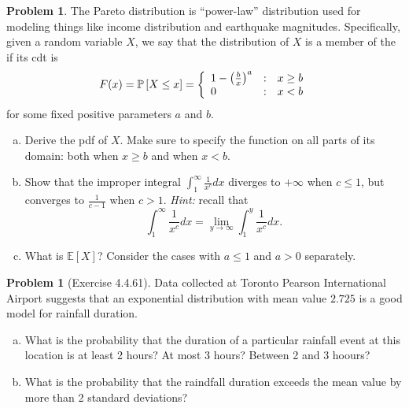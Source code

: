 \documentclass[10pt]{article}
\theoremstyle{definition}
\newtheorem{problem}[theorem]{Problem}
\newcommand{\1}[1]{\textbf{1}_{\left[#1\right]}} %
\def\E{\mathbb{E}} %
\def\P{\mathbb{P}} %
\newcommand{\dempfcolor}[1]{{\color{RoyalBlue}#1}}
\newcommand{\demph}[1]{\dempfcolor{{\sl #1}}}
\begin{document}
\begin{problem}
  The Pareto distribution is ``power-law'' distribution used for modeling
  things like income distribution and earthquake magnitudes. Specifically,
  given a random variable $X$, we say that the distribution of $X$ is a member
  of the \demph{Pareto family of distributions} if its cdt is
  \begin{equation*}
    F(x) = \P\left[X \leq x\right] = \left\{ \begin{array}{l@{\quad:\quad}l} 1-\left( \frac{b}{x} \right)^{a}  & x \geq b\\ 0& x<b\end{array}\right.
  \end{equation*}
  for some fixed positive parameters $a$ and $b$.
  \begin{enumerate}[(a)]
    \item Derive the pdf of $X$. Make sure to specify the function on all
    parts of its domain: both when $x \geq b$ and when $x<b$. 
    \item Show that the improper integral
    $\int_{1}^{\infty}\frac{1}{x^{c}}dx$ diverges to $+\infty$ when $c \leq
    1$, but converges to $\frac{1}{c-1}$ when $c>1$. \textit{Hint:} recall that
    \begin{equation*}
      \int_{1}^{\infty}\frac{1}{x^{c}}dx = \lim_{y \to \infty} \int_{1}^{y}  \frac{1}{x^{c}}dx.
    \end{equation*}
    \item What is $\E\left[X \right]$? Consider the cases with $a \leq 1$ and
    $a>0$ separately.
  \end{enumerate}
\end{problem}



\begin{problem}[Exercise 4.4.61]
  Data collected at Toronto Pearson International Airport suggests that an
  exponential distribution with mean value $2.725$ is a good model for
  rainfall duration.
  \begin{enumerate}[(a)]
    \item What is the probability that the duration of a particular rainfall
    event at this location is at least 2 hours? At most 3 hours? Between 2 and
    3 hoours?
    \item What is the probability that the raindfall duration exceeds the mean
    value by more than 2 standard deviations? 
  \end{enumerate}
\end{problem}
\end{document}
